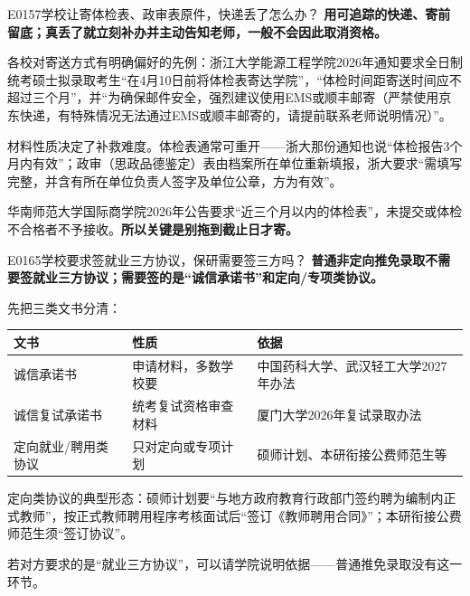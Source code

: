 \begin{qa}{E0157}{学校让寄体检表、政审表原件，快递丢了怎么办？}
\textbf{用可追踪的快递、寄前留底；真丢了就立刻补办并主动告知老师，一般不会因此取消资格。}

各校对寄送方式有明确偏好的先例：浙江大学能源工程学院2026年通知要求全日制统考硕士拟录取考生“在4月10日前将体检表寄达学院”，“体检时间距寄送时间应不超过三个月”，并“为确保邮件安全，强烈建议使用EMS或顺丰邮寄（严禁使用京东快递，有特殊情况无法通过EMS或顺丰邮寄的，请提前联系老师说明情况）”。

材料性质决定了补救难度。体检表通常可重开——浙大那份通知也说“体检报告3个月内有效”；政审（思政品德鉴定）表由档案所在单位重新填报，浙大要求“需填写完整，并含有所在单位负责人签字及单位公章，方为有效”。

华南师范大学国际商学院2026年公告要求“近三个月以内的体检表”，未提交或体检不合格者不予接收。\textbf{所以关键是别拖到截止日才寄。}
\end{qa}

\begin{qa}{E0165}{学校要求签就业三方协议，保研需要签三方吗？}
\textbf{普通非定向推免录取不需要签就业三方协议；需要签的是“诚信承诺书”和定向/专项类协议。}

先把三类文书分清：

\par\vspace{2pt}\nobreak\begin{center}\footnotesize
\begin{tabularx}{\textwidth}{>{\raggedright\arraybackslash}X>{\raggedright\arraybackslash}X>{\raggedright\arraybackslash}X}
\toprule
\textbf{文书} & \textbf{性质} & \textbf{依据} \\ \midrule
诚信承诺书 & 申请材料，多数学校要 & 中国药科大学、武汉轻工大学2027年办法 \\
诚信复试承诺书 & 统考复试资格审查材料 & 厦门大学2026年复试录取办法 \\
定向就业/聘用类协议 & 只对定向或专项计划 & 硕师计划、本研衔接公费师范生等 \\
\bottomrule
\end{tabularx}
\end{center}\vspace{2pt}\par

定向类协议的典型形态：硕师计划要“与地方政府教育行政部门签约聘为编制内正式教师”，按正式教师聘用程序考核面试后“签订《教师聘用合同》”；本研衔接公费师范生须“签订协议”。

若对方要求的是“就业三方协议”，可以请学院说明依据——普通推免录取没有这一环节。
\end{qa}

